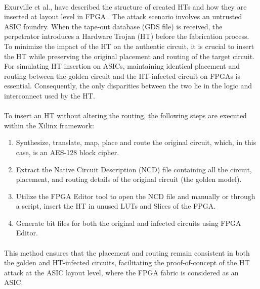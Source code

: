 \paragraph*{}
Exurville et al., have described the structure of created HTs and how they are inserted at layout level in FPGA \cite{7092492}. The attack scenario involves an untrusted ASIC foundry. When the tape-out database (GDS file) is received, the perpetrator introduces a Hardware Trojan (HT) before the fabrication process. To minimize the impact of the HT on the authentic circuit, it is crucial to insert the HT while preserving the original placement and routing of the target circuit. For simulating HT insertion on ASICs, maintaining identical placement and routing between the golden circuit and the HT-infected circuit on FPGAs is essential. Consequently, the only disparities between the two lie in the logic and interconnect used by the HT.
\paragraph*{}
To insert an HT without altering the routing, the following steps are executed within the Xilinx framework:
\begin{enumerate}
	\item Synthesize, translate, map, place and route the original circuit, which, in this case, is an AES-128 block cipher.
	\item Extract the Native Circuit Description (NCD) file containing all the circuit, placement, and routing details of the original circuit (the golden model).
	\item Utilize the FPGA Editor tool to open the NCD file and manually or through a script, insert the HT in unused LUTs and Slices of the FPGA.
	\item Generate bit files for both the original and infected circuits using FPGA Editor.
\end{enumerate}
\paragraph*{}
This method ensures that the placement and routing remain consistent in both the golden and HT-infected circuits, facilitating the proof-of-concept of the HT attack at the ASIC layout level, where the FPGA fabric is considered as an ASIC.
